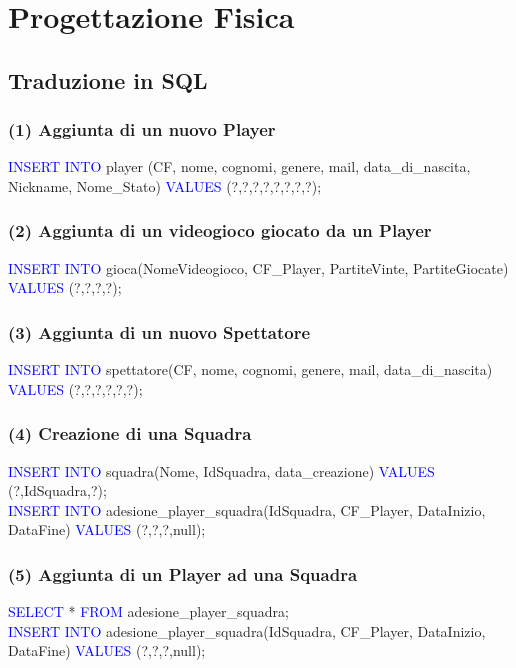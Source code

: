 \documentclass[a4paper,12pt]{report}
\begin{document}
\chapter{Progettazione Fisica}
\section{Traduzione in SQL}
\subsection*{(1) Aggiunta di un nuovo Player}
\textcolor{blue}{INSERT INTO} player (CF, nome, cognomi, genere, mail, data\_di\_nascita, Nickname, Nome\_Stato)
\textcolor{blue}{VALUES} (?,?,?,?,?,?,?,?);

\subsection*{(2) Aggiunta di un videogioco giocato da un Player}
\textcolor{blue}{INSERT INTO} gioca(NomeVideogioco, CF\_Player, PartiteVinte, PartiteGiocate)
\textcolor{blue}{VALUES} (?,?,?,?);

\subsection*{(3) Aggiunta di un nuovo Spettatore}
\textcolor{blue}{INSERT INTO} spettatore(CF, nome, cognomi, genere, mail, data\_di\_nascita)
\textcolor{blue}{VALUES} (?,?,?,?,?,?);

\subsection*{(4) Creazione di una Squadra}
\textcolor{blue}{INSERT INTO} squadra(Nome, IdSquadra, data\_creazione)
\textcolor{blue}{VALUES} (?,IdSquadra,?);\\


\noindent \textcolor{blue}{INSERT INTO} adesione\_player\_squadra(IdSquadra, CF\_Player, DataInizio, DataFine)
\textcolor{blue}{VALUES} (?,?,?,null);

\subsection*{(5) Aggiunta di un Player ad una Squadra}
\textcolor{blue}{SELECT} * \textcolor{blue}{FROM} adesione\_player\_squadra;\\

\noindent \textcolor{blue}{INSERT INTO} adesione\_player\_squadra(IdSquadra, CF\_Player, DataInizio, DataFine)
\textcolor{blue}{VALUES} (?,?,?,null);
\end{document}
